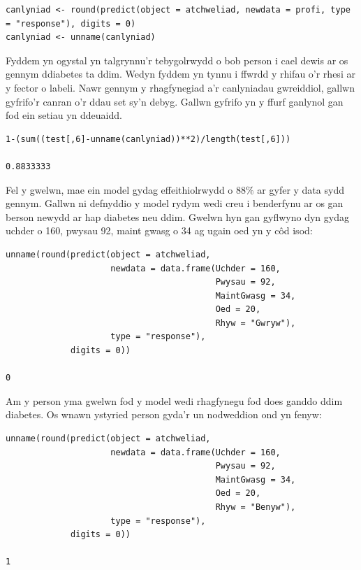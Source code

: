 \begin{verbatim}
canlyniad <- round(predict(object = atchweliad, newdata = profi, type = "response"), digits = 0)
canlyniad <- unname(canlyniad)
\end{verbatim}

Fyddem yn ogystal yn talgrynnu'r tebygolrwydd o bob person i cael dewis ar os gennym ddiabetes ta ddim. Wedyn fyddem yn tynnu i ffwrdd y rhifau o'r rhesi ar y fector o labeli. Nawr gennym y rhagfynegiad a'r canlyniadau gwreiddiol, gallwn gyfrifo'r canran o'r ddau set sy'n debyg. Gallwn gyfrifo yn y ffurf ganlynol gan fod ein setiau yn ddeuaidd.

\begin{verbatim}
1-(sum((test[,6]-unname(canlyniad))**2)/length(test[,6]))

0.8833333
\end{verbatim}

Fel y gwelwn, mae ein model gydag effeithiolrwydd o $88\%$ ar gyfer y data sydd gennym. Gallwn ni defnyddio y model rydym wedi creu i benderfynu ar os gan berson newydd ar hap diabetes neu ddim. Gwelwn hyn gan gyflwyno dyn gydag uchder o 160, pwysau 92, maint gwasg o 34 ag ugain oed yn y c\^{o}d isod: 

\begin{verbatim}
unname(round(predict(object = atchweliad, 
                     newdata = data.frame(Uchder = 160,
                                          Pwysau = 92, 
                                          MaintGwasg = 34, 
                                          Oed = 20, 
                                          Rhyw = "Gwryw"), 
                     type = "response"),
             digits = 0))

0
\end{verbatim}

Am y person yma gwelwn fod y model wedi rhagfynegu fod does ganddo ddim diabetes. Os wnawn ystyried person gyda'r un nodweddion ond yn fenyw:

\begin{verbatim}
unname(round(predict(object = atchweliad,
                     newdata = data.frame(Uchder = 160,
                                          Pwysau = 92, 
                                          MaintGwasg = 34, 
                                          Oed = 20, 
                                          Rhyw = "Benyw"), 
                     type = "response"),
             digits = 0))

1
\end{verbatim}

